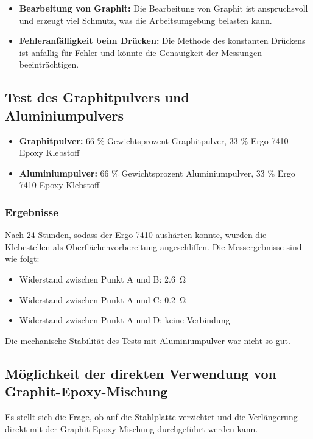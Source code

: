 \begin{itemize}
    \item \textbf{Bearbeitung von Graphit:} Die Bearbeitung von Graphit ist anspruchsvoll und erzeugt viel Schmutz, was die Arbeitsumgebung belasten kann.
    \item \textbf{Fehleranfälligkeit beim Drücken:} Die Methode des konstanten Drückens ist anfällig für Fehler und könnte die Genauigkeit der Messungen beeinträchtigen.
\end{itemize}

\subsection{Test des Graphitpulvers und Aluminiumpulvers}

\begin{itemize}
    \item \textbf{Graphitpulver:} 66 \% Gewichtsprozent Graphitpulver, 33 \% Ergo 7410 Epoxy Klebstoff
    \item \textbf{Aluminiumpulver:} 66 \% Gewichtsprozent Aluminiumpulver, 33 \% Ergo 7410 Epoxy Klebstoff
\end{itemize}

\subsubsection{Ergebnisse}

Nach 24 Stunden, sodass der Ergo 7410 aushärten konnte, wurden die Klebestellen als Oberflächenvorbereitung angeschliffen. Die Messergebnisse sind wie folgt:

\begin{itemize}
    \item Widerstand zwischen Punkt A und B: \SI{2.6}{\ohm}
    \item Widerstand zwischen Punkt A und C: \SI{0.2}{\ohm}
    \item Widerstand zwischen Punkt A und D: keine Verbindung
\end{itemize}

Die mechanische Stabilität des Tests mit Aluminiumpulver war nicht so gut.

\subsection{Möglichkeit der direkten Verwendung von Graphit-Epoxy-Mischung}

Es stellt sich die Frage, ob auf die Stahlplatte verzichtet und die Verlängerung direkt mit der Graphit-Epoxy-Mischung durchgeführt werden kann.

